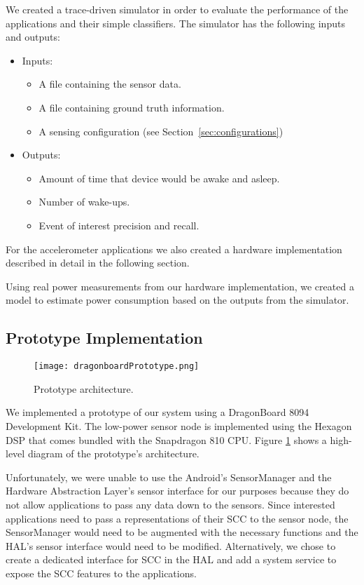 We created a trace-driven simulator in order to evaluate 
the performance of the applications and their simple 
classifiers.  The simulator has the following inputs and
outputs:
\begin{itemize}
	\item Inputs:
		\begin{itemize}
			\item A file containing the sensor data.
			\item A file containing ground truth information.
			\item A sensing configuration (see Section~\ref{sec:configurations})
		\end{itemize}
		
	\item Outputs:
		\begin{itemize}
			\item Amount of time that device would be awake and asleep.
			\item Number of wake-ups.
			\item Event of interest precision and recall.
		\end{itemize}
\end{itemize}

For the accelerometer applications we also created a hardware
implementation described in detail in the following section.

Using real power measurements from our hardware implementation,
we created a model to estimate power consumption based on the
outputs from the simulator. 

\subsection{Prototype Implementation}

\begin{figure}[t]
	\centering
	\texttt{[image: dragonboardPrototype.png]}
	\caption{Prototype architecture.}
    \label{fig:dragonboardPrototype}
\end{figure}

We implemented a prototype of our system using a DragonBoard 8094 
Development Kit.  The low-power sensor node is implemented using
the Hexagon DSP that comes bundled with the Snapdragon 810 CPU.  Figure
\ref{fig:dragonboardPrototype} shows a high-level diagram of the
prototype's architecture.

Unfortunately, we were unable to use the Android's SensorManager and
the Hardware Abstraction Layer's sensor interface for our purposes
because they do not allow applications to pass any data down to the
sensors.  Since interested applications need to pass a 
representations of their SCC to the sensor node, the SensorManager
would need to be augmented with the necessary functions and the 
HAL's sensor interface would need to be modified.  Alternatively,
we chose to create a dedicated interface for SCC in the HAL and
add a system service to expose the SCC features to the applications.

